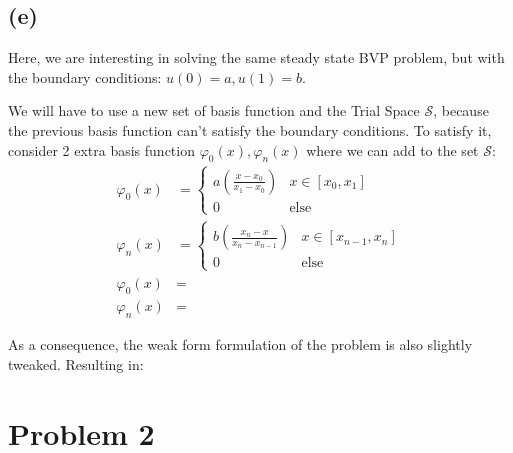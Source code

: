 \documentclass[]{article}
\begin{document}
    \subsection*{(e)}
        \hspace{1.1em}
        Here, we are interesting in solving the same steady state BVP problem, but with the boundary conditions: $u(0) = a, u(1) = b$. 
        \par
        We will have to use a new set of basis function and the Trial Space $\mathcal{S}$, because the previous basis function can't satisfy the boundary conditions. To satisfy it, consider 2 extra basis function $\varphi_0(x), \varphi_{n}(x)$ where we can add to the set $\mathcal{S}$: 
        \begin{align*}\tag{1.e.1}\label{eqn:1.e.1}
            \varphi_0(x) &= 
            \begin{cases}
                a\left(\frac{x - x_0}{x_1 - x_0}\right) & 
                x \in [x_0, x_1]
                \\
                0 & \text{else}
            \end{cases}
            \\
            \varphi_{n}(x) &= 
            \begin{cases}
                b\left(
                    \frac{x_{n} - x}{x_n - x_{n - 1}}
                \right) & x\in [x_{n - 1}, x_n]
                \\
                0 & \text{else}
            \end{cases}
            \\
            \varphi_0(x) &= 
            \\
            \varphi_{n}(x) &= 
        \end{align*}
        \par
        As a consequence, the weak form formulation of the problem is also slightly tweaked. Resulting in: 

    

\section*{Problem 2}
\end{document}
